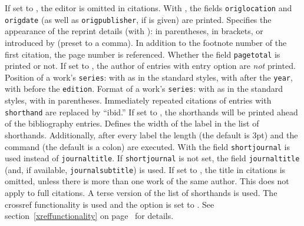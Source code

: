 \documentclass[english]{scrartcl}
\begin{document}
	  If set to , the editor is omitted in citations.
	  With , the fields \texttt{origlocation} and 
	  \texttt{origdate} (as well as \texttt{origpublisher}, if 
	   is given) are printed.
	  Specifies the appearance of the reprint details (with 
	  ): in parentheses, in brackets, or introduced by 
	   (preset to a comma).
	  In addition to the footnote number of the first citation, the page number
	  is referenced.
	  Whether the field \texttt{pagetotal} is printed or not.
	  If set to , the author of entries with entry option 
		 are \emph{not} printed.
	  Position of a work's \texttt{series}: with  as in the 
	  standard styles, with  after the \texttt{year}, with  before the \texttt{edition}.
    Format of a work's \texttt{series}: with  as in the 
	  standard styles, with  in parentheses.
	  Immediately repeated citations of entries with \texttt{shorthand} are 
	  replaced by \enquote{ibid.}
	  If set to , the shorthands will be printed ahead of the bibliography
		entries.
	  Defines the width of the label in the list of shorthands. Additionally, 
	  after every label the length  (the default is 3pt) and 
	  the command  (the default is a colon) are executed.
    With  the field \texttt{shortjournal} is used 
    instead of \texttt{journaltitle}. If \texttt{shortjournal} is not set,
    the field \texttt{journaltitle} (and, if available, \texttt{journalsubtitle})
    is used.
    If set to , the title in citations is omitted, unless there is more
		than one work of the same author. This does not apply to full citations.
	  A terse version of the list of shorthands is used.
	  The crossref functionality is used and the option  is set
		to . See section~\ref{xreffunctionality} on page~\pageref{xreffunctionality} 
		for details.
\end{document}
